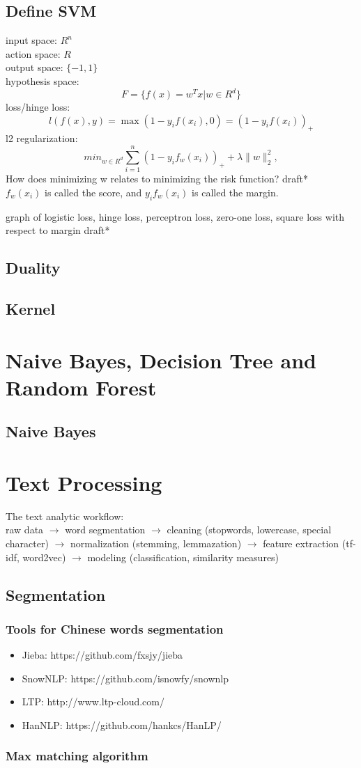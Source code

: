 \documentclass{report}
\begin{document}
\section{Define SVM}

input space: $R^n$ \\
action space: $R$ \\
output space: $\{-1, 1\}$\\
hypothesis space: \[ F = \{ f(x) = w^T x | w \in R^d\}\]
loss/hinge loss: \[ l\left( f(x), y \right) = \max(1 - y_if(x_i), 0) = \left( 1 - y_if(x_i) \right)_+ \]
l2 regularization: \[
	min_{w \in R^d}\sum_{i=1}^{n} \left( 1 -y_if_w(x_i) \right)_+ + \lambda\|w\|_2^2 
,\] 
How does minimizing w relates to minimizing the risk function? draft*\\
$f_w(x_i)$ is called the score, and $y_if_w(x_i)$ is called the margin.

graph of logistic loss, hinge loss, perceptron loss, zero-one loss, square loss with respect to margin draft*
\section{Duality}
\section{Kernel}
\chapter{Naive Bayes, Decision Tree and Random Forest}
\section{Naive Bayes}

\chapter{Text Processing}
The text analytic workflow: \\ \linebreak
raw data $\rightarrow$ word segmentation $\rightarrow$ cleaning (stopwords, lowercase, special character) $\rightarrow$ normalization (stemming, lemmazation) $\rightarrow$ feature extraction (tf-idf, word2vec) $\rightarrow$ modeling (classification, similarity measures)

\section{Segmentation}
\subsection{Tools for Chinese words segmentation}
\begin{itemize}
	\item Jieba: https://github.com/fxsjy/jieba
	\item SnowNLP: https://github.com/isnowfy/snownlp
	\item LTP: http://www.ltp-cloud.com/
	\item HanNLP: https://github.com/hankcs/HanLP/
\end{itemize}

\subsection{Max matching algorithm}
\end{document}
